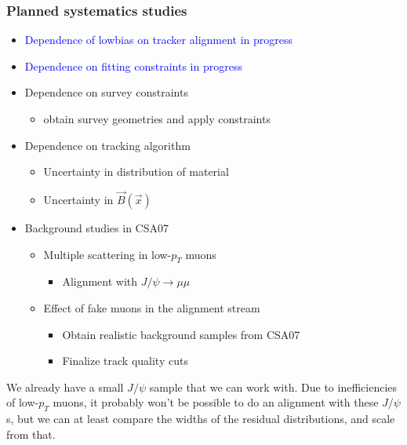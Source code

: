 \documentclass[compress]{beamer}
\begin{document}
\begin{frame}
\frametitle{Planned systematics studies}
\begin{itemize}\setlength{\itemsep}{0.25 cm}
\item \textcolor{blue}{Dependence of lowbias on tracker alignment \hfill in progress}
\item \textcolor{blue}{Dependence on fitting constraints \hfill in progress}
\item Dependence on survey constraints
\begin{itemize}
\item obtain survey geometries and apply constraints
\end{itemize}
\item Dependence on tracking algorithm
\begin{itemize}
\item Uncertainty in distribution of material
\item Uncertainty in $\vec{B}(\vec{x})$
\end{itemize}
\item Background studies in CSA07
\begin{itemize}
\item Multiple scattering in low-$p_T$ muons
\begin{itemize}
\item Alignment with $J/\psi\to\mu\mu$
\end{itemize}
\item Effect of fake muons in the alignment stream
\begin{itemize}
\item Obtain realistic background samples from CSA07
\item Finalize track quality cuts
\end{itemize}
\end{itemize}
\end{itemize}
\end{frame}

\begin{notes}

\item We already have a small $J/\psi$ sample that we can work with.
Due to inefficiencies of low-$p_T$ muons, it probably won't be
possible to do an alignment with these $J/\psi$s, but we can at least
compare the widths of the residual distributions, and scale from that.
\end{notes}
\end{document}
